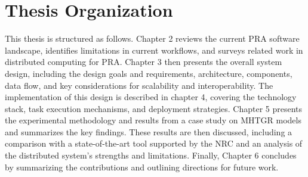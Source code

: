 \section{Thesis Organization}
This thesis is structured as follows. Chapter 2 reviews the current PRA software landscape, identifies limitations in current workflows, and surveys related work in distributed computing for PRA. Chapter 3 then presents the overall system design, including the design goals and requirements, architecture, components, data flow, and key considerations for scalability and interoperability. The implementation of this design is described in chapter 4, covering the technology stack, task execution mechanisms, and deployment strategies. Chapter 5 presents the experimental methodology and results from a case study on MHTGR models and summarizes the key findings. These results are then discussed, including a comparison with a state-of-the-art tool supported by the NRC and an analysis of the distributed system's strengths and limitations. Finally, Chapter 6 concludes by summarizing the contributions and outlining directions for future work.

